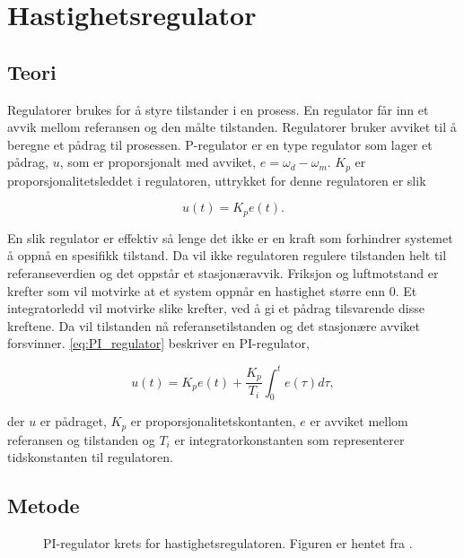 \section{Hastighetsregulator}\label{sec:hastighetsreg}


\subsection{Teori}

Regulatorer brukes for å styre tilstander i en prosess. En regulator får inn et avvik mellom referansen og den målte tilstanden. Regulatorer bruker avviket til å beregne et pådrag til prosessen. P-regulator er en type regulator som lager et pådrag, $u$,  som er proporsjonalt med avviket, $e = \omega_d - \omega_m$. $K_p$ er proporsjonalitetsleddet i regulatoren, uttrykket for denne regulatoren er slik

\begin{equation}
    \label{eq:P_regulator}
    u(t) = K_p e(t).
\end{equation}

En slik regulator er effektiv så lenge det ikke er en kraft som forhindrer systemet å oppnå en spesifikk tilstand. Da vil ikke regulatoren regulere tilstanden helt til referanseverdien og det oppstår et stasjonæravvik. Friksjon og luftmotstand er krefter som vil motvirke at et system oppnår en hastighet større enn $0$. Et integratorledd vil motvirke slike krefter, ved å gi et pådrag tilsvarende disse kreftene. Da vil tilstanden nå referansetilstanden og det stasjonære avviket forsvinner. \autoref{eq:PI_regulator} beskriver en PI-regulator,

\begin{equation}
    \label{eq:PI_regulator}
    u(t) = K_p e(t) + \frac{K_p}{T_i} \int_{0}^{t} e(\tau) d\tau,
\end{equation}

der $u$ er pådraget, $K_p$ er proporsjonalitetskontanten, $e$ er avviket mellom referansen og tilstanden og $T_i$ er integratorkonstanten som representerer tidskonstanten til regulatoren.







\subsection{Metode}

\begin{figure}[b]
    \centering
    
    \caption{PI-regulator krets for hastighetsregulatoren. Figuren er hentet fra \cite{AnalogMotorlabbOppgaver}.}
    \label{fig:krets_hastighets_regulator}
\end{figure}

